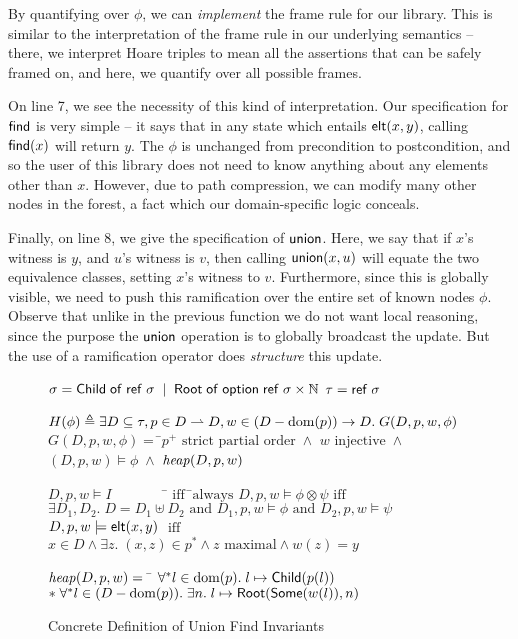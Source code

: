 By quantifying over $\phi$, we can \emph{implement} the frame rule for
our library. This is similar to the interpretation of the frame rule
in our underlying semantics -- there, we interpret Hoare triples to mean all
the assertions that can be safely framed on, and here, we quantify over
all possible frames. 

On line 7, we see the necessity of this kind of interpretation. Our
specification for $\mathsf{find}$ is very simple -- it says that in any state
which entails $\mathsf{elt}({x}, {y})$, calling $\mathsf{find}(x)$ will return $y$. The
$\phi$ is unchanged from precondition to postcondition, and so the
user of this library does not need to know anything about any elements
other than $x$. However, due to path compression, we can modify 
many other nodes in the forest, a fact which our domain-specific
logic conceals. 

Finally, on line 8, we give the specification of $\mathsf{union}$. Here, 
we say that if $x$'s witness is $y$, and $u$'s witness is $v$, then 
calling $\mathsf{union}(x,u)$ will equate the two equivalence classes, setting
$x$'s witness to $v$. Furthermore, since this is globally visible, we
need to push this ramification over the entire set of known 
nodes $\phi$. Observe that unlike in the previous function we do not
want local reasoning, since the purpose the $\mathsf{union}$ operation 
is to globally broadcast the update. But the use of a ramification
operator does \emph{structure} this update. 


\begin{figure}
\mbox{}
\begin{specification}
\nextline $\sigma = \mathsf{Child} \;\mathsf{of}\; \mathsf{ref}\;\sigma \;\;|\;\; \mathsf{Root} \;\mathsf{of}\; \mathsf{option }{\;}{\mathsf{ref}\;\sigma} \times \mathbb{N}$ 
\nextline $\tau = \mathsf{ref}\;\sigma$ 

\nextline
   $H(\phi) \triangleq \exists D \subseteq \tau, p \in D \rightharpoonup D, w \in (D-\mbox{dom}({p})) \to D.\;G(D,p,w,\phi)$
\nextline[1em] $G(D, p, w, \phi) =\;$\=$p^{+} \mbox{ strict partial order} \;\land$ 
\nextline \> $w \mbox{ injective} \;\land$ 
\nextline \> $(D, p, w) \models \phi \;\land$
\nextline \> $\mathit{heap}(D, p, w)$ 

\nextline[1em] $D, p, w \models I \qquad\qquad$\=$\mbox{ iff}\;\;$\=$\mbox{always}$ 
\nextline      $D, p, w \models \phi \otimes \psi$\>$\mbox{ iff}$\>$
                     \exists D_1, D_2.\; D = D_1 \uplus D_2 \mbox{ and } D_1, p, w \models \phi \mbox{ and } 
                     D_2, p, w \models \psi$
\nextline      $D, p, w \models \mathsf{elt}({x}, {y})$ \> $\mbox{ iff }$\>$x \in D \land \exists z.\;(x,z) \in p^* \land z\mbox{ maximal} \land w(z) = y$

\nextline[1em] $\mathit{heap}(D, p, w) = \;\;$\=
    $\forall^{*} l \in \mbox{dom}({p}).\; l \mapsto \mathsf{Child}(p(l))$ 
\nextline\>  $* \; \forall^{*} l \in (D - \mbox{dom}({p})).\; \exists n.\;l \mapsto \mathsf{Root}(\mathsf{Some}(w(l)), n)$ 
\end{specification}
\caption{Concrete Definition of Union Find Invariants}
\label{union-find:invariant}
\end{figure}
 
